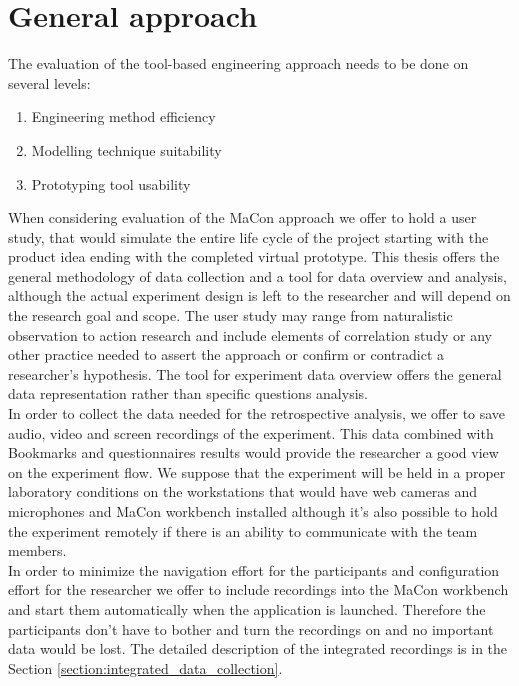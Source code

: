 \section{General approach}
The evaluation of the tool-based engineering approach needs to be done on several levels:

\begin{enumerate}
	\item Engineering method efficiency
    \item Modelling technique suitability
    \item Prototyping tool usability
\end{enumerate}

When considering evaluation of the MaCon approach we offer to hold a user study, that would simulate the entire life cycle of the project starting with the product idea ending with the completed virtual prototype. This thesis offers the general methodology of data collection and a tool for data overview and analysis, although the actual experiment design is left to the researcher and will depend on the research goal and scope. The user study may range from naturalistic observation to action research and include elements of correlation study or any other practice needed to assert the approach or confirm or contradict a researcher's hypothesis. The tool for experiment data overview offers the general data representation rather than specific questions analysis.\\ 

In order to collect the data needed for the retrospective analysis, we offer to save audio, video and screen recordings of the experiment. This data combined with Bookmarks and questionnaires results would provide the researcher a good view on the experiment flow. We suppose that the experiment will be held in a proper laboratory conditions on the workstations that would have web cameras and microphones and MaCon workbench installed although it's also possible to hold the experiment remotely if there is an ability to communicate with the team members. \\

In order to minimize the navigation effort for the participants and configuration effort for the researcher we offer to include recordings into the MaCon workbench and start them automatically when the application is launched. Therefore the participants don't have to bother and turn the recordings on and no important data would be lost. The detailed description of the integrated recordings is in the Section \ref{section:integrated_data_collection}.\\

